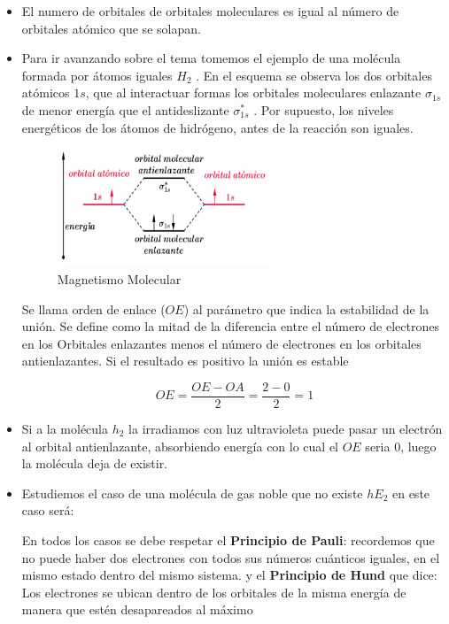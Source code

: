 \begin{itemize}
	\item El numero de orbitales de orbitales moleculares es igual al número de orbitales atómico que se solapan. 		
	\item Para ir avanzando sobre el tema tomemos el ejemplo de una molécula formada por átomos iguales $H_{2}$ . En el esquema se observa los dos orbitales atómicos $1s$, que al interactuar formas los orbitales moleculares enlazante $\sigma_{1s}$ de menor energía que el antideslizante $\sigma_{1s}^{*}$ . Por supuesto, los niveles energéticos de los átomos de hidrógeno, antes de la reacción son iguales.
	
\begin{figure}[H]
    \centering
    \includegraphics[width=0.6\textwidth]{./Figures/MagMolecular}
	\caption{Magnetismo Molecular}
	\label{fig:MagMolecular}
\end{figure}

Se llama orden de enlace ($OE$) al parámetro que indica la estabilidad de la unión. Se define como la mitad de la diferencia entre el número de electrones en los Orbitales enlazantes menos el número de electrones en los orbitales antienlazantes. Si el resultado es positivo la unión es estable

\begin{equation}
	OE=\frac{OE-OA}{2}=\frac{2-0}{2}=1
\end{equation}
	
	
	\item Si a la molécula $h_{2}$ la irradiamos con luz ultravioleta puede pasar un electrón al orbital antienlazante, absorbiendo energía con lo cual el $OE$ seria 0, luego la molécula deja de existir.
	
	\item Estudiemos el caso de una molécula de gas noble que no existe $hE_{2}$ en este caso será:

En todos los casos se debe respetar el \textbf{Principio de Pauli}: recordemos que no puede haber dos electrones con todos sus números cuánticos iguales, en el mismo estado dentro del mismo sistema. y el \textbf{Principio de Hund} que dice: Los electrones se ubican dentro de los orbitales de la misma energía de manera que estén desapareados al máximo


\end{itemize}
